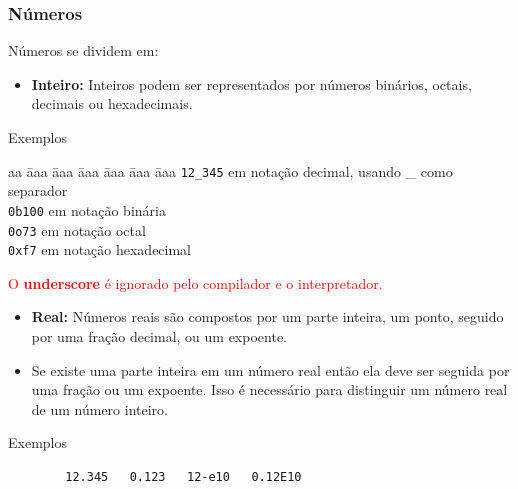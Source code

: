 \begin{frame}[fragile, allowframebreaks=0.9]

	\frametitle{Números}
	
	Números se dividem em:
	
	\begin{itemize}
		
		\item \textbf{Inteiro:} Inteiros podem ser representados por números binários, octais,
		decimais ou hexadecimais.
		
	\end{itemize}
	
	\begin{exampleblock}{Exemplos}
		\begin{tabbing}
			aa \= aaa \= aaa \= aaa \= aaa \= aaa \= aaa \kill
			\> \texttt{12\_345} \> \>  em notação decimal, usando \_ como separador \\
			\> \texttt{0b100} \> \>  em notação binária  \\
			\> \texttt{0o73} \> \>  em notação octal \\
			\> \texttt{0xf7} \> \>  em notação hexadecimal  
		\end{tabbing}
	\end{exampleblock}

\textcolor{red}{O \textbf{underscore} é ignorado pelo compilador e o interpretador.}

\framebreak
	
	\begin{itemize}
		
		\item \textbf{Real:} Números reais são compostos por um parte inteira, um ponto,
		 seguido por uma fração decimal, ou um expoente.
		
		\item Se existe uma parte inteira em um número real então ela deve ser seguida por uma
		fração ou um expoente. Isso é necessário para distinguir um número real de um número inteiro.
	\end{itemize}
	
	\begin{exampleblock}{Exemplos}
		\begin{verbatim}
		12.345   0.123   12-e10   0.12E10
		\end{verbatim}
	\end{exampleblock}
	
\end{frame}

